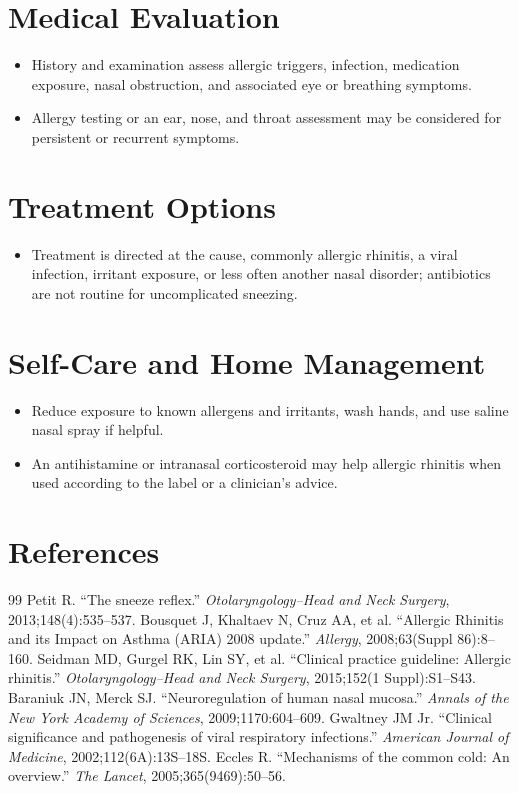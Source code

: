 \section*{Medical Evaluation}
\begin{itemize}
  \item History and examination assess allergic triggers, infection, medication exposure, nasal obstruction, and associated eye or breathing symptoms.
  \item Allergy testing or an ear, nose, and throat assessment may be considered for persistent or recurrent symptoms.
\end{itemize}

\section*{Treatment Options}
\begin{itemize}
  \item Treatment is directed at the cause, commonly allergic rhinitis, a viral infection, irritant exposure, or less often another nasal disorder; antibiotics are not routine for uncomplicated sneezing.
\end{itemize}

\section*{Self-Care and Home Management}
\begin{itemize}
  \item Reduce exposure to known allergens and irritants, wash hands, and use saline nasal spray if helpful.
  \item An antihistamine or intranasal corticosteroid may help allergic rhinitis when used according to the label or a clinician’s advice.
\end{itemize}

\section*{References}
\begin{thebibliography}{99}
 Petit R. ``The sneeze reflex.'' \textit{Otolaryngology--Head and Neck Surgery}, 2013;148(4):535--537.
 Bousquet J, Khaltaev N, Cruz AA, et al. ``Allergic Rhinitis and its Impact on Asthma (ARIA) 2008 update.'' \textit{Allergy}, 2008;63(Suppl 86):8--160.
 Seidman MD, Gurgel RK, Lin SY, et al. ``Clinical practice guideline: Allergic rhinitis.'' \textit{Otolaryngology--Head and Neck Surgery}, 2015;152(1 Suppl):S1--S43.
 Baraniuk JN, Merck SJ. ``Neuroregulation of human nasal mucosa.'' \textit{Annals of the New York Academy of Sciences}, 2009;1170:604--609.
 Gwaltney JM Jr. ``Clinical significance and pathogenesis of viral respiratory infections.'' \textit{American Journal of Medicine}, 2002;112(6A):13S--18S.
 Eccles R. ``Mechanisms of the common cold: An overview.'' \textit{The Lancet}, 2005;365(9469):50--56.
\end{thebibliography}
